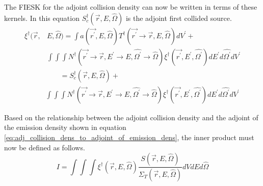 The FIESK for the adjoint collision density can now be written in terms of 
these kernels. In this equation $S_c^{\dagger}(\vec{r},E,\hat{\Omega})$ is the
adjoint first collided source.
\begin{equation*}
  \begin{split}
    \xi^{\dagger}(\vec{r},&E,\hat{\Omega}) = \int a(\vec{r^{'}},E,\hat{\Omega}) 
    T^{\dagger}(\vec{r^{'}} \to \vec{r},E,\hat{\Omega}) dV^{'} + \\
    & \int\int\int
    N^{\dagger}(\vec{r^{'}} \to \vec{r},E^{'} \to E,\hat{\Omega^{'}} \to \hat{\Omega})
      \xi^{\dagger}(\vec{r^{'}},E^{'},\hat{\Omega^{'}}) dE^{'}d\hat{\Omega^{'}}dV^{'}
  \end{split}
\end{equation*}
\begin{equation*}
  \begin{split}
    \qquad & \qquad = S_c^{\dagger}(\vec{r},E,\hat{\Omega}) + \\
    & \int\int\int
    N^{\dagger}(\vec{r^{'}} \to \vec{r},E^{'} \to E,\hat{\Omega^{'}} \to \hat{\Omega})
      \xi^{\dagger}(\vec{r^{'}},E^{'},\hat{\Omega^{'}}) dE^{'}d\hat{\Omega^{'}}dV^{'}
  \end{split}
\end{equation*}

Based on the relationship between the adjoint collision density and the adjoint
of the emission density shown in equation 
\ref{eq:adj_collision_dens_to_adjoint_of_emission_dens}, the inner product must
now be defined as follows.
\begin{equation}
  I = \int\int\int \xi^{\dagger}(\vec{r},E,\hat{\Omega})
  \frac{S(\vec{r},E,\hat{\Omega})}{\Sigma_T(\vec{r},E,\hat{\Omega})}
  dV dE d\hat{\Omega}
\end{equation}
 
